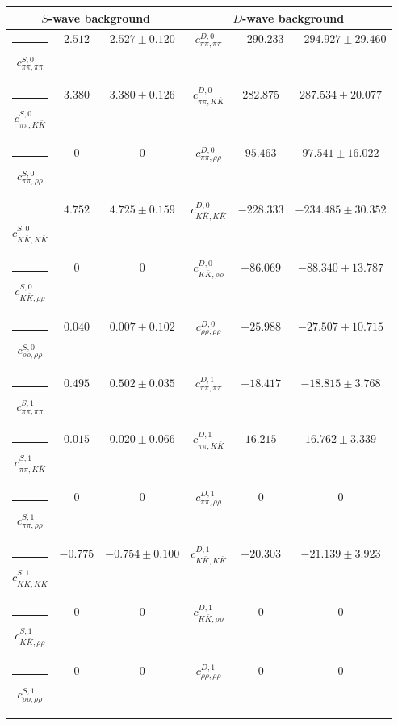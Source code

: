 \begin{table}[h]
\begin{ruledtabular}
\begin{tabular}{c c c c c c c c c}
\end{tabular}
\vspace{2em}
\begin{tabular}{c c c c c c}
\multicolumn{3}{c}{$S$-wave background}  & \multicolumn{3}{c}{$D$-wave background} \\ \hline
\rule[-0.2cm]{-0.1cm}{.55cm} $c^{S,0}_{\pi\pi,\pi\pi}$ &$2.512$ & $2.527 \pm 0.120$ & $c^{D,0}_{\pi\pi,\pi\pi}$ &$-290.233$ & $-294.927 \pm 29.460$ \\
\rule[-0.2cm]{-0.1cm}{.55cm} $c^{S,0}_{\pi\pi,K\bar K}$ &$3.380$ & $3.380 \pm 0.126$ & $c^{D,0}_{\pi\pi,K\bar K}$ &$282.875$ & $287.534 \pm 20.077$ \\
\rule[-0.2cm]{-0.1cm}{.55cm} $c^{S,0}_{\pi\pi,\rho\rho}$ &$0$ & $0$ & $c^{D,0}_{\pi\pi,\rho\rho}$ &$95.463$ & $97.541 \pm 16.022$ \\
\rule[-0.2cm]{-0.1cm}{.55cm} $c^{S,0}_{K\bar K,K\bar K}$ &$4.752$ & $4.725 \pm 0.159$ & $c^{D,0}_{K\bar K,K\bar K}$ &$-228.333$ & $-234.485 \pm 30.352$ \\
\rule[-0.2cm]{-0.1cm}{.55cm} $c^{S,0}_{K\bar K,\rho\rho}$ &$0$ & $0$ & $c^{D,0}_{K\bar K,\rho\rho}$ &$-86.069$ & $-88.340 \pm 13.787$ \\
\rule[-0.2cm]{-0.1cm}{.55cm} $c^{S,0}_{\rho\rho,\rho\rho}$ &$0.040$ & $0.007 \pm 0.102$ & $c^{D,0}_{\rho\rho,\rho\rho}$ &$-25.988$ & $-27.507 \pm 10.715$ \\
\rule[-0.2cm]{-0.1cm}{.55cm} $c^{S,1}_{\pi\pi,\pi\pi}$ &$0.495$ & $0.502 \pm 0.035$ & $c^{D,1}_{\pi\pi,\pi\pi}$ &$-18.417$ & $-18.815 \pm 3.768$ \\
\rule[-0.2cm]{-0.1cm}{.55cm} $c^{S,1}_{\pi\pi,K\bar K}$ &$0.015$ & $0.020 \pm 0.066$ & $c^{D,1}_{\pi\pi,K\bar K}$ &$16.215$ & $16.762 \pm 3.339$ \\
\rule[-0.2cm]{-0.1cm}{.55cm} $c^{S,1}_{\pi\pi,\rho\rho}$ &$0$ & $0$ & $c^{D,1}_{\pi\pi,\rho\rho}$ &$0$ & $0$ \\
\rule[-0.2cm]{-0.1cm}{.55cm} $c^{S,1}_{K\bar K,K\bar K}$ &$-0.775$ & $-0.754 \pm 0.100$ & $c^{D,1}_{K\bar K,K\bar K}$ &$-20.303$ & $-21.139 \pm 3.923$ \\
\rule[-0.2cm]{-0.1cm}{.55cm} $c^{S,1}_{K\bar K,\rho\rho}$ &$0$ & $0$ & $c^{D,1}_{K\bar K,\rho\rho}$ &$0$ & $0$ \\
\rule[-0.2cm]{-0.1cm}{.55cm} $c^{S,1}_{\rho\rho,\rho\rho}$ &$0$ & $0$ & $c^{D,1}_{\rho\rho,\rho\rho}$ &$0$ & $0$ \\
\end{tabular}
\end{ruledtabular}
\end{table}
